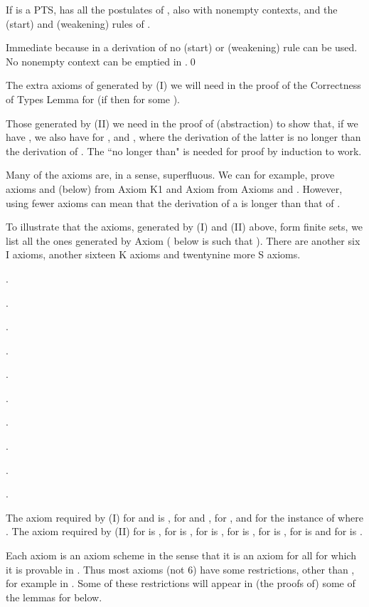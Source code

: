 \documentclass{LMCS}
\begin{document}
\begin{thm}
{\begin{defi}[]\label{D:lam}
  If  is a PTS,  has all the postulates of
  , also with nonempty contexts, and the (start) and
  (weakening) rules of .
\end{defi}

\begin{lem}\label{L:nineteen}
  
\end{lem}

\proof Immediate because in a derivation of  no
  (start) or (weakening) rule can be used. No nonempty context can be
  emptied in .\qed

  The extra axioms of  generated by (I) we will need in
  the proof of the Correctness of Types Lemma for  (if
   then  for some ).

  Those generated by (II) we need in the proof of (abstraction) to
  show that, if we have , we also
  have for ,  and ,
  where the derivation of the latter is no longer than the derivation
  of . The ``no longer than" is
  needed for proof by induction to work.

  Many of the axioms are, in a sense, superfluous.  We can for
  example, prove axioms  and  (below) from Axiom
  K1 and Axiom  from Axioms  and .  However,
  using fewer axioms can mean that the derivation of a
   is longer than
  that of .

  To illustrate that the axioms, generated by (I) and (II) above, form
  finite sets, we list all the ones generated by Axiom (
  below is such that ). There are another six
  I axioms, another sixteen K axioms and twentynine more S axioms.

\noindent{}\quad .

\noindent{}\quad .

\noindent{}\quad .

\noindent{}\quad .

\noindent{}\quad .

\noindent{}\quad .

\noindent{}\quad .

\noindent{}\quad .

\noindent{}\quad .

\noindent{}\quad .

  The axiom required by (I) for  and  is ,
  for  and , for ,  and for
   the instance of  where . The axiom required
  by (II) for  is , for  is , for  is
  , for  is , for  is , for  is
   and for  is .

  Each axiom is an axiom scheme in the sense that it is an axiom for
  all  for which it is provable in . Thus most
  axioms (not 6) have some restrictions, other than , for example  in . Some of these restrictions will appear in
  (the proofs of) some of the lemmas for  below.

}
\end{thm}
\end{document}
